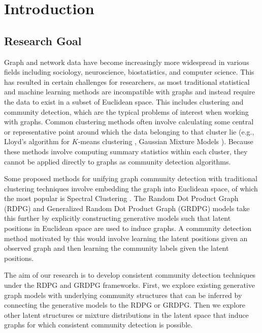 \documentclass[
  11pt,
]{article}
\begin{document}
\hypertarget{introduction}{%
\section{Introduction}\label{introduction}}

\hypertarget{research-goal}{%
\subsection{Research Goal}\label{research-goal}}

Graph and network data have become increasingly more widespread in
various fields including sociology, neuroscience, biostatistics, and
computer science. This has resulted in certain challenges for
researchers, as most traditional statistical and machine learning
methods are incompatible with graphs and instead require the data to
exist in a subset of Euclidean space. This includes clustering and
community detection, which are the typical problems of interest when
working with graphs. Common clustering methods often involve calculating
some central or representative point around which the data belonging to
that cluster lie (e.g., Lloyd's algorithm for \(K\)-means clustering
\cite{1056489}, Gaussian Mixture Models
\cite{doi:10.1198/016214502760047131}). Because these methods involve
computing summary statistics within each cluster, they cannot be applied
directly to graphs as community detection algorithms.

Some proposed methods for unifying graph community detection with
traditional clustering techniques involve embedding the graph into
Euclidean space, of which the most popular is Spectral Clustering
\cite{DBLP:journals/corr/abs-0711-0189}. The Random Dot Product Graph
(RDPG) \cite{10.1007/978-3-540-77004-6_11} and Generalized Random Dot
Product Graph (GRDPG) \cite{rubindelanchy2017statistical} models take
this further by explicitly constructing generative models such that
latent positions in Euclidean space are used to induce graphs. A
community detection method motivated by this would involve learning the
latent positions given an observed graph and then learning the community
labels given the latent positions.

The aim of our research is to develop consistent community detection
techniques under the RDPG and GRDPG frameworks. First, we explore
existing generative graph models with underlying community structures
that can be inferred by connecting the generative models to the RDPG or
GRDPG. Then we explore other latent structures or mixture distributions
in the latent space that induce graphs for which consistent community
detection is possible.
\end{document}
